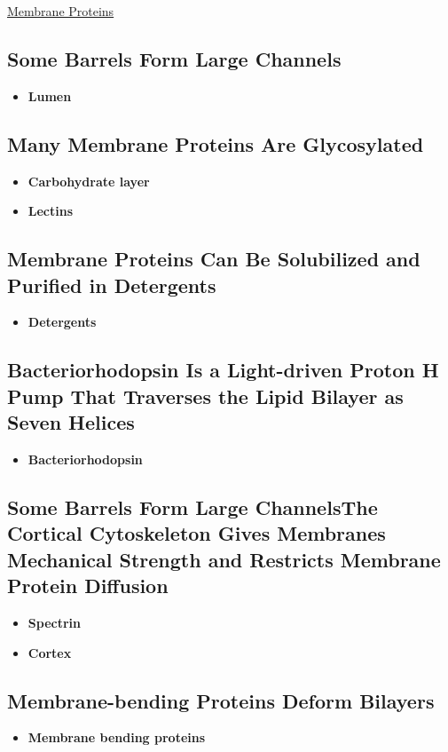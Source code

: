 \documentclass[12pt,letterpaper]{article}
\begin{document}
\begin{secbox}{\hyperlink{10}{Membrane Proteins}}
{    \subsection*{Some \bfg{\beta} Barrels Form Large Channels}
    \begin{itemize}
        \item \textbf{Lumen}
    \end{itemize}

    \subsection*{Many Membrane Proteins Are Glycosylated}
    \begin{itemize}
        \item \textbf{Carbohydrate layer}
        \item \textbf{Lectins}
    \end{itemize}

    \subsection*{Membrane Proteins Can Be Solubilized and Purified in Detergents}
    \begin{itemize}
        \item \textbf{Detergents}
    \end{itemize}

    \subsection*{Bacteriorhodopsin Is a Light-driven Proton H\bfg{^+} Pump That
    Traverses the Lipid Bilayer as Seven \bfg{\alpha} Helices}
    \begin{itemize}
        \item \textbf{Bacteriorhodopsin}
    \end{itemize}

    \subsection*{Some \bfg{\beta} Barrels Form Large ChannelsThe Cortical Cytoskeleton Gives Membranes Mechanical Strength and Restricts Membrane Protein Diffusion}
    \begin{itemize}
        \item \textbf{Spectrin}
        \item \textbf{Cortex}
    \end{itemize}

    \subsection*{Membrane-bending Proteins Deform Bilayers}
    \begin{itemize}
        \item \textbf{Membrane bending proteins}
    \end{itemize}
}\end{secbox}
\end{document}
